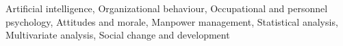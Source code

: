 \documentclass[]{article}
\begin{document}
Artificial intelligence, Organizational behaviour, Occupational and personnel psychology, Attitudes and morale, Manpower management, Statistical analysis, Multivariate analysis, Social change and development
\end{document}
